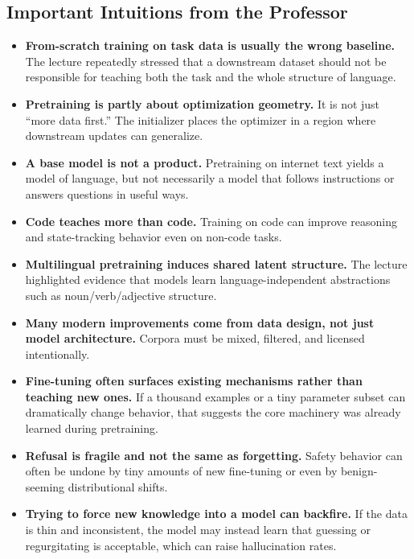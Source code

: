 \documentclass[11pt]{article}
\begin{document}
\subsection{Important Intuitions from the Professor}
\begin{itemize}
    \item \textbf{From-scratch training on task data is usually the wrong baseline.} The lecture repeatedly stressed that a downstream dataset should not be responsible for teaching both the task and the whole structure of language.
    \item \textbf{Pretraining is partly about optimization geometry.} It is not just ``more data first.'' The initializer places the optimizer in a region where downstream updates can generalize.
    \item \textbf{A base model is not a product.} Pretraining on internet text yields a model of language, but not necessarily a model that follows instructions or answers questions in useful ways.
    \item \textbf{Code teaches more than code.} Training on code can improve reasoning and state-tracking behavior even on non-code tasks.
    \item \textbf{Multilingual pretraining induces shared latent structure.} The lecture highlighted evidence that models learn language-independent abstractions such as noun/verb/adjective structure.
    \item \textbf{Many modern improvements come from data design, not just model architecture.} Corpora must be mixed, filtered, and licensed intentionally.
    \item \textbf{Fine-tuning often surfaces existing mechanisms rather than teaching new ones.} If a thousand examples or a tiny parameter subset can dramatically change behavior, that suggests the core machinery was already learned during pretraining.
    \item \textbf{Refusal is fragile and not the same as forgetting.} Safety behavior can often be undone by tiny amounts of new fine-tuning or even by benign-seeming distributional shifts.
    \item \textbf{Trying to force new knowledge into a model can backfire.} If the data is thin and inconsistent, the model may instead learn that guessing or regurgitating is acceptable, which can raise hallucination rates.
\end{itemize}
\end{document}

